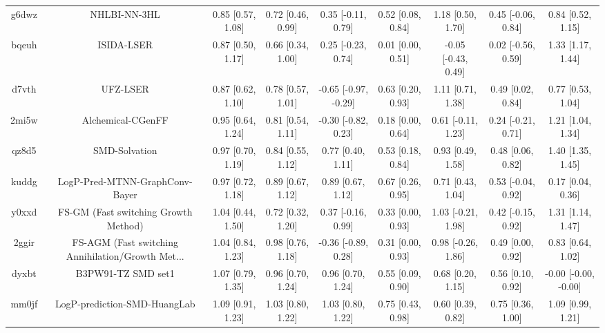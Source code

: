 \documentclass{article}
\begin{document}
\begin{center}
\begin{longtable}{|ccccccccc|}
 g6dwz &                                       NHLBI-NN-3HL &  0.85 [0.57, 1.08] &  0.72 [0.46, 0.99] &    0.35 [-0.11, 0.79] &  0.52 [0.08, 0.84] &    1.18 [0.50, 1.70] &   0.45 [-0.06, 0.84] &     0.84 [0.52, 1.15] \\
 bqeuh &                                         ISIDA-LSER &  0.87 [0.50, 1.17] &  0.66 [0.34, 1.00] &    0.25 [-0.23, 0.74] &  0.01 [0.00, 0.51] &  -0.05 [-0.43, 0.49] &   0.02 [-0.56, 0.59] &     1.33 [1.17, 1.44] \\
 d7vth &                                           UFZ-LSER &  0.87 [0.62, 1.10] &  0.78 [0.57, 1.01] &  -0.65 [-0.97, -0.29] &  0.63 [0.20, 0.93] &    1.11 [0.71, 1.38] &    0.49 [0.02, 0.84] &     0.77 [0.53, 1.04] \\
 2mi5w &                                  Alchemical-CGenFF &  0.95 [0.64, 1.24] &  0.81 [0.54, 1.11] &   -0.30 [-0.82, 0.23] &  0.18 [0.00, 0.64] &   0.61 [-0.11, 1.23] &   0.24 [-0.21, 0.71] &     1.21 [1.04, 1.34] \\
 qz8d5 &                                      SMD-Solvation &  0.97 [0.70, 1.19] &  0.84 [0.55, 1.12] &     0.77 [0.40, 1.11] &  0.53 [0.18, 0.84] &    0.93 [0.49, 1.58] &    0.48 [0.06, 0.82] &     1.40 [1.35, 1.45] \\
 kuddg &                     LogP-Pred-MTNN-GraphConv-Bayer &  0.97 [0.72, 1.18] &  0.89 [0.67, 1.12] &     0.89 [0.67, 1.12] &  0.67 [0.26, 0.95] &    0.71 [0.43, 1.04] &   0.53 [-0.04, 0.92] &     0.17 [0.04, 0.36] \\
 y0xxd &               FS-GM (Fast switching Growth Method) &  1.04 [0.44, 1.50] &  0.72 [0.32, 1.20] &    0.37 [-0.16, 0.99] &  0.33 [0.00, 0.93] &   1.03 [-0.21, 1.98] &   0.42 [-0.15, 0.92] &     1.31 [1.14, 1.47] \\
 2ggir &  FS-AGM (Fast switching Annihilation/Growth Met... &  1.04 [0.84, 1.23] &  0.98 [0.76, 1.18] &   -0.36 [-0.89, 0.28] &  0.31 [0.00, 0.93] &   0.98 [-0.26, 1.86] &    0.49 [0.00, 0.92] &     0.83 [0.64, 1.02] \\
 dyxbt &                                 B3PW91-TZ SMD set1 &  1.07 [0.79, 1.35] &  0.96 [0.70, 1.24] &     0.96 [0.70, 1.24] &  0.55 [0.09, 0.90] &    0.68 [0.20, 1.15] &    0.56 [0.10, 0.92] &  -0.00 [-0.00, -0.00] \\
 mm0jf &                       LogP-prediction-SMD-HuangLab &  1.09 [0.91, 1.23] &  1.03 [0.80, 1.22] &     1.03 [0.80, 1.22] &  0.75 [0.43, 0.98] &    0.60 [0.39, 0.82] &    0.75 [0.36, 1.00] &     1.09 [0.99, 1.21] \\

\end{longtable}
\end{center}
\end{document}
